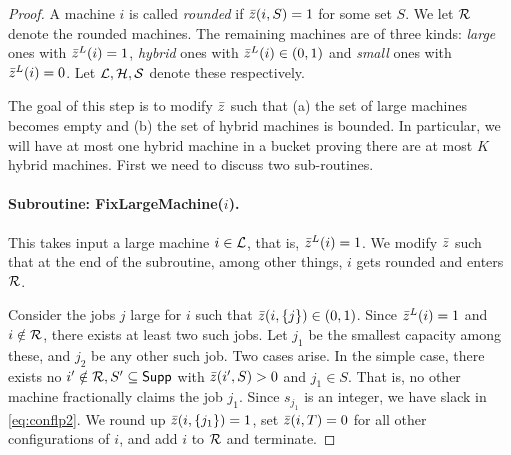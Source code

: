 \documentclass{article}[11pt]
\def\Supp{\mathsf{Supp}\xspace}
\begin{document}
\begin{proof}
	
	A machine $i$ is called {\em rounded} if $\bar z(i,S) = 1$ for some set $S$. We let ${\cal R}$ denote the rounded machines.
	The remaining machines are of three kinds:  {\em large} ones with $\bar z^L(i) = 1$, {\em hybrid} ones with $\bar z^L(i) \in (0,1)$ and {\em small} ones with $\bar z^L(i) = 0$. 
	Let ${\cal L},{\cal H},{\cal S}$ denote these respectively.  \medskip
	
	
	
	The goal of this step is to modify $\bar z$ such that (a) the set of large machines becomes empty and (b) the set of hybrid machines is bounded. In particular, we will have at most one hybrid machine in a bucket 
	proving there are at most $K$ hybrid machines. First we need to discuss two sub-routines.
	
	\paragraph{Subroutine: {\sf FixLargeMachine}($i$).}
	This takes input a large machine $i\in{\cal L}$, that is,  $\bar z^L(i) = 1$. We modify $\bar z$ such that at the end of the subroutine, among other things, $i$ gets rounded and enters ${\cal R}$.
	
	Consider the jobs $j$ large for $i$ such that $\bar z(i,\{j\}) \in (0,1)$. Since $\bar z^L(i) = 1$ and $i\notin {\cal R}$, there exists at least two such jobs.
	Let $j_1$ be the smallest capacity among these, and $j_2$  be any other such job. %
	Two cases arise. In the simple case, there exists no $i'\notin \calR, S'\subseteq \Supp$ with $\bar z(i',S) > 0$ and $j_1 \in S$. That is, no other machine fractionally claims the job $j_1$.
	Since $s_{j_1}$ is an integer, we have slack in \eqref{eq:conflp2}. We round up $\bar z(i,\{j_1\}) = 1$, set $\bar z(i,T) = 0$ for all other configurations of $i$, and add $i$ to ${\cal R}$ and terminate.
	

\end{proof}
\end{document}
